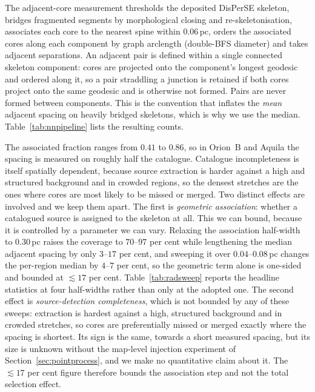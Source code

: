 \documentclass[usenatbib,twoside,twocolumn]{mnras}
\begin{document}
The adjacent-core measurement thresholds the deposited DisPerSE skeleton, bridges fragmented segments by morphological closing and re-skeletonisation, associates each core to the nearest spine within $0.06$\,pc, orders the associated cores along each component by graph arclength (double-BFS diameter) and takes adjacent separations. An adjacent pair is defined within a single connected skeleton component: cores are projected onto the component's longest geodesic and ordered along it, so a pair straddling a junction is retained if both cores project onto the same geodesic and is otherwise not formed. Pairs are never formed between components. This is the convention that inflates the \emph{mean} adjacent spacing on heavily bridged skeletons, which is why we use the median. Table~\ref{tab:nnpipeline} lists the resulting counts.



The associated fraction ranges from $0.41$ to $0.86$, so in Orion~B and Aquila the spacing is measured on roughly half the catalogue. Catalogue incompleteness is itself spatially dependent, because source extraction is harder against a high and structured background and in crowded regions, so the densest stretches are the ones where cores are most likely to be missed or merged. Two distinct effects are involved and we keep them apart. The first is \emph{geometric association}: whether a catalogued source is assigned to the skeleton at all. This we can bound, because it is controlled by a parameter we can vary. Relaxing the association half-width to $0.30$\,pc raises the coverage to $70$--$97$ per cent while lengthening the median adjacent spacing by only $3$--$17$ per cent, and sweeping it over $0.04$--$0.08$\,pc changes the per-region median by $4$--$7$ per cent, so the geometric term alone is one-sided and bounded at $\lesssim17$ per cent. Table~\ref{tab:radsweep} reports the headline statistics at four half-widths rather than only at the adopted one. The second effect is \emph{source-detection completeness}, which is not bounded by any of these sweeps: extraction is hardest against a high, structured background and in crowded stretches, so cores are preferentially missed or merged exactly where the spacing is shortest. Its sign is the same, towards a short measured spacing, but its size is unknown without the map-level injection experiment of Section~\ref{sec:pointprocess}, and we make no quantitative claim about it. The $\lesssim17$ per cent figure therefore bounds the association step and not the total selection effect.
\end{document}
